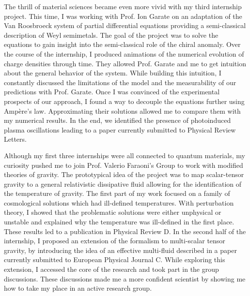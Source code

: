 \documentclass[12pt]{article}
\begin{document}
The thrill of material sciences became even more vivid with my third internship project. This time, I was working with Prof. Ion Garate on an adaptation of the Van Roosbroeck system of partial differential equations providing a semi-classical description of Weyl semimetals. The goal of the project was to solve the equations to gain insight into the semi-classical role of the chiral anomaly. Over the course of the internship, I produced animations of the numerical evolution of charge densities through time. They allowed Prof. Garate and me to get intuition about the general behavior of the system. While building this intuition, I constantly discussed the limitations of the model and the measurability of our predictions with Prof. Garate. Once I was convinced of the experimental prospects of our approach, I found a way to decouple the equations further using Ampère's law. Approximating their solutions allowed me to compare them with my numerical results. In the end, we identified the presence of photoinduced plasma oscillations leading to a paper currently submitted to Physical Review Letters. 
\vspace{0.4cm}   

\newpage 

Although my first three internships were all connected to quantum materials, my curiosity pushed me to join Prof. Valerio Faraoni's Group to work with modified theories of gravity. The prototypical idea of the project was to map scalar-tensor gravity to a general relativistic dissipative fluid allowing for the identification of the temperature of gravity. The first part of my work focused on a family of cosmological solutions which had ill-defined temperatures. With perturbation theory, I showed that the problematic solutions were either unphysical or unstable and explained why the temperature was ill-defined in the first place. These results led to a publication in Physical Review D. In the second half of the internship, I proposed an extension of the formalism to multi-scalar tensor gravity, by introducing the idea of an effective multi-fluid described in a paper currently submitted to European Physical Journal C. While exploring this extension, I accessed the core of the research and took part in the group discussions. These discussions made me a more confident scientist by showing me how to take my place in an active research group.  \vspace{0.4cm}   
\end{document}
